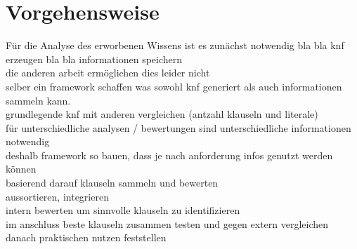 \section{Vorgehensweise}


Für die Analyse des erworbenen Wissens ist es zunächst notwendig bla bla knf erzeugen bla bla informationen speichern\\
die anderen arbeit ermöglichen dies leider nicht\\
selber ein framework schaffen was sowohl knf generiert als auch informationen sammeln kann.\\
grundlegende knf mit anderen vergleichen (antzahl klauseln und literale)\\
für unterschiedliche analysen / bewertungen sind unterschiedliche informationen notwendig\\
deshalb framework so bauen, dass je nach anforderung infos genutzt werden können\\
basierend darauf klauseln sammeln und bewerten\\
aussortieren, integrieren\\
intern bewerten um sinnvolle klauseln zu identifizieren\\
im anschluss beste klauseln zusammen testen und gegen extern vergleichen\\
danach praktischen nutzen feststellen\\